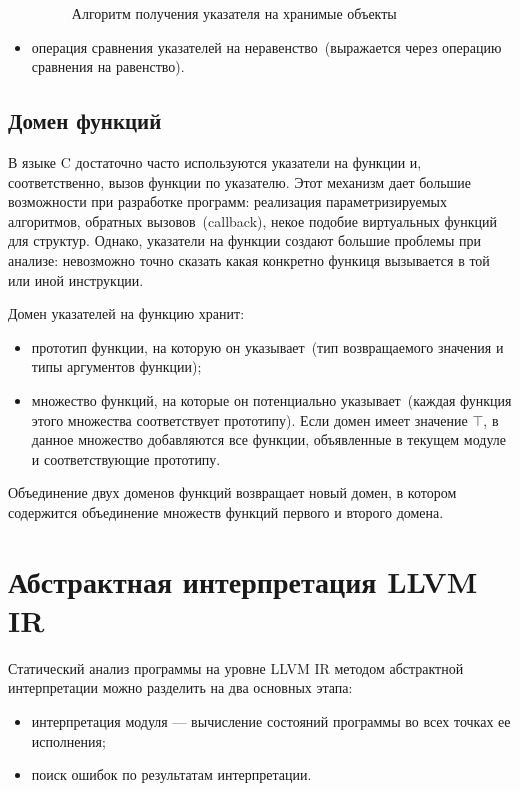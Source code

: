 \begin{itemize}
\begin{figure}[h!]
\begin{algorithmic}[1]
\end{algorithmic}
\caption{Алгоритм получения указателя на хранимые объекты}
\label{image:ptrEq}
\end{figure}

\item операция сравнения указателей на неравенство~(выражается через операцию
сравнения на равенство).
\end{itemize}

\subsection{Домен функций}
В языке C достаточно часто используются указатели на функции и, соответственно,
вызов функции по указателю. Этот механизм дает большие возможности при 
разработке программ: реализация параметризируемых алгоритмов, обратных 
вызовов~(callback), некое подобие виртуальных функций для структур. Однако, 
указатели на функции создают большие проблемы при анализе: невозможно точно 
сказать какая конкретно функиця вызывается в той или иной инструкции.

Домен указателей на функцию хранит:
\begin{itemize}
\item прототип функции, на которую он указывает~(тип возвращаемого значения
и типы аргументов функции);
\item множество функций, на которые он потенциально указывает~(каждая функция
этого множества соответствует прототипу). Если домен имеет значение $\top$, в
данное множество добавляются все функции, объявленные в текущем модуле и 
соответствующие прототипу.
\end{itemize}

Объединение двух доменов функций возвращает новый домен, в котором содержится
объединение множеств функций первого и второго домена.

\section{Абстрактная интерпретация LLVM IR}
Статический анализ программы на уровне LLVM IR методом абстрактной 
интерпретации можно разделить на два основных этапа:
\begin{itemize}
\item интерпретация модуля --- вычисление состояний программы во всех точках
ее исполнения;
\item поиск ошибок по результатам интерпретации.
\end{itemize}

